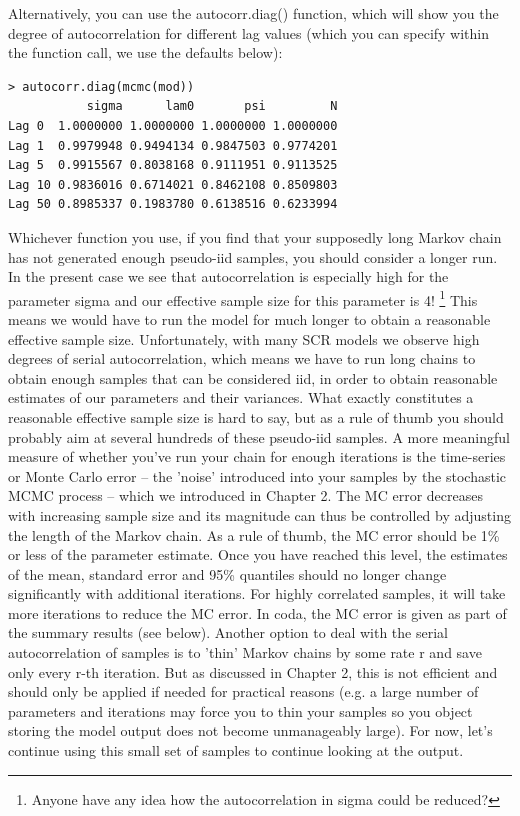 Alternatively, you can use the autocorr.diag() function, which will show you the degree of autocorrelation for different lag values (which you can specify within the function call, we use the defaults below):
\begin{verbatim}
> autocorr.diag(mcmc(mod)) 
           sigma      lam0       psi         N
Lag 0  1.0000000 1.0000000 1.0000000 1.0000000
Lag 1  0.9979948 0.9494134 0.9847503 0.9774201
Lag 5  0.9915567 0.8038168 0.9111951 0.9113525
Lag 10 0.9836016 0.6714021 0.8462108 0.8509803
Lag 50 0.8985337 0.1983780 0.6138516 0.6233994
\end{verbatim} 
Whichever function you use, if you find that your supposedly long Markov chain has not generated enough pseudo-iid samples, you should consider a longer run. In the present case we see that autocorrelation is especially high for the parameter sigma and our effective sample size for this parameter is 4! \footnote{Anyone have any idea how the autocorrelation in sigma could be reduced?} This means we would have to run the model for much longer to obtain a reasonable effective sample size. Unfortunately, with many SCR models we observe high degrees of serial autocorrelation, which means we have to run long chains to obtain enough samples that can be considered iid, in order to obtain reasonable estimates of our parameters and their variances. 
What exactly constitutes a reasonable effective sample size is hard to say, but as a rule of thumb you should probably aim at several hundreds of these pseudo-iid samples. A more meaningful measure of whether you've run your chain for enough iterations is the time-series or Monte Carlo error – the 'noise' introduced into your samples by the stochastic MCMC process – which we introduced in Chapter 2. The MC error decreases with increasing sample size and its magnitude can thus be controlled by adjusting the length of the Markov chain. As a rule of thumb, the MC error should be 1\% or less of the parameter estimate. Once you have reached this level, the estimates of the mean, standard error and 95\% quantiles should no longer change significantly with additional iterations. For highly correlated samples, it will take more iterations to reduce the MC error. In coda, the MC error is given as part of the summary results (see below). 
 Another option to deal with the serial autocorrelation of samples is to 'thin' Markov chains by some rate r and save only every r-th iteration. But as discussed in Chapter 2, this is not efficient and should only be applied if needed for practical reasons (e.g. a large number of parameters and iterations may force you to thin your samples so you object storing the model output does not become unmanageably large).
For now, let's continue using this small set of samples to continue looking at the output.

